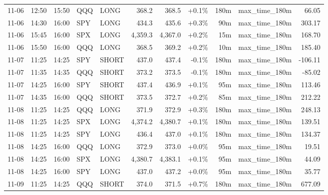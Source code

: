\documentclass[11pt,a4paper,twoside]{article}
\begin{document}
\begin{center}
\begin{longtable}{>{\color{txtmain}}l l l l l r r r r >{\color{txtmain}}l r}
11-06 & 12:50 & 15:50 & QQQ & LONG & 368.2 & 368.5 & \textcolor{wingreen}{+0.1\%} & 180m & max\_time\_180m & \textcolor{wingreen}{66.05} \\
11-06 & 14:30 & 16:00 & SPY & LONG & 434.3 & 435.6 & \textcolor{wingreen}{+0.3\%} & 90m & max\_time\_180m & \textcolor{wingreen}{303.17} \\
11-06 & 15:45 & 16:00 & SPX & LONG & 4,359.3 & 4,367.0 & \textcolor{wingreen}{+0.2\%} & 15m & max\_time\_180m & \textcolor{wingreen}{168.70} \\
11-06 & 15:50 & 16:00 & QQQ & LONG & 368.5 & 369.2 & \textcolor{wingreen}{+0.2\%} & 10m & max\_time\_180m & \textcolor{wingreen}{185.40} \\
11-07 & 11:25 & 14:25 & SPY & SHORT & 437.0 & 437.4 & \textcolor{lossred}{-0.1\%} & 180m & max\_time\_180m & \textcolor{lossred}{-106.11} \\
11-07 & 11:35 & 14:35 & QQQ & SHORT & 373.2 & 373.5 & \textcolor{lossred}{-0.1\%} & 180m & max\_time\_180m & \textcolor{lossred}{-85.02} \\
11-07 & 14:25 & 16:00 & SPY & SHORT & 437.4 & 436.9 & \textcolor{wingreen}{+0.1\%} & 95m & max\_time\_180m & \textcolor{wingreen}{113.46} \\
11-07 & 14:35 & 16:00 & QQQ & SHORT & 373.5 & 372.7 & \textcolor{wingreen}{+0.2\%} & 85m & max\_time\_180m & \textcolor{wingreen}{212.22} \\
11-08 & 11:25 & 14:25 & QQQ & LONG & 371.9 & 372.9 & \textcolor{wingreen}{+0.3\%} & 180m & max\_time\_180m & \textcolor{wingreen}{248.13} \\
11-08 & 11:25 & 14:25 & SPX & LONG & 4,374.2 & 4,380.7 & \textcolor{wingreen}{+0.1\%} & 180m & max\_time\_180m & \textcolor{wingreen}{139.51} \\
11-08 & 11:25 & 14:25 & SPY & LONG & 436.4 & 437.0 & \textcolor{wingreen}{+0.1\%} & 180m & max\_time\_180m & \textcolor{wingreen}{134.37} \\
11-08 & 14:25 & 16:00 & QQQ & LONG & 372.9 & 373.0 & \textcolor{wingreen}{+0.0\%} & 95m & max\_time\_180m & \textcolor{wingreen}{19.51} \\
11-08 & 14:25 & 16:00 & SPX & LONG & 4,380.7 & 4,383.1 & \textcolor{wingreen}{+0.1\%} & 95m & max\_time\_180m & \textcolor{wingreen}{44.09} \\
11-08 & 14:25 & 16:00 & SPY & LONG & 437.0 & 437.2 & \textcolor{wingreen}{+0.0\%} & 95m & max\_time\_180m & \textcolor{wingreen}{35.77} \\
11-09 & 11:25 & 14:25 & QQQ & SHORT & 374.0 & 371.5 & \textcolor{wingreen}{+0.7\%} & 180m & max\_time\_180m & \textcolor{wingreen}{677.09} \\

\end{longtable}
\end{center}
\end{document}

